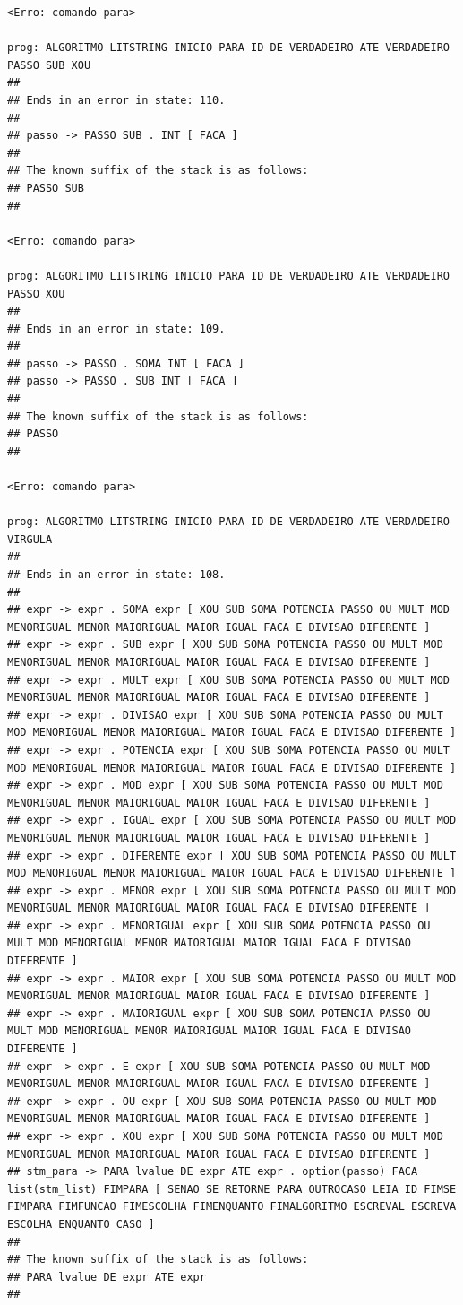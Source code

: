 \documentclass[hidelinks,12pt]{article}
\begin{document}
\begin{lstlisting}
<Erro: comando para>

prog: ALGORITMO LITSTRING INICIO PARA ID DE VERDADEIRO ATE VERDADEIRO PASSO SUB XOU 
##
## Ends in an error in state: 110.
##
## passo -> PASSO SUB . INT [ FACA ]
##
## The known suffix of the stack is as follows:
## PASSO SUB 
##

<Erro: comando para>

prog: ALGORITMO LITSTRING INICIO PARA ID DE VERDADEIRO ATE VERDADEIRO PASSO XOU 
##
## Ends in an error in state: 109.
##
## passo -> PASSO . SOMA INT [ FACA ]
## passo -> PASSO . SUB INT [ FACA ]
##
## The known suffix of the stack is as follows:
## PASSO 
##

<Erro: comando para>

prog: ALGORITMO LITSTRING INICIO PARA ID DE VERDADEIRO ATE VERDADEIRO VIRGULA 
##
## Ends in an error in state: 108.
##
## expr -> expr . SOMA expr [ XOU SUB SOMA POTENCIA PASSO OU MULT MOD MENORIGUAL MENOR MAIORIGUAL MAIOR IGUAL FACA E DIVISAO DIFERENTE ]
## expr -> expr . SUB expr [ XOU SUB SOMA POTENCIA PASSO OU MULT MOD MENORIGUAL MENOR MAIORIGUAL MAIOR IGUAL FACA E DIVISAO DIFERENTE ]
## expr -> expr . MULT expr [ XOU SUB SOMA POTENCIA PASSO OU MULT MOD MENORIGUAL MENOR MAIORIGUAL MAIOR IGUAL FACA E DIVISAO DIFERENTE ]
## expr -> expr . DIVISAO expr [ XOU SUB SOMA POTENCIA PASSO OU MULT MOD MENORIGUAL MENOR MAIORIGUAL MAIOR IGUAL FACA E DIVISAO DIFERENTE ]
## expr -> expr . POTENCIA expr [ XOU SUB SOMA POTENCIA PASSO OU MULT MOD MENORIGUAL MENOR MAIORIGUAL MAIOR IGUAL FACA E DIVISAO DIFERENTE ]
## expr -> expr . MOD expr [ XOU SUB SOMA POTENCIA PASSO OU MULT MOD MENORIGUAL MENOR MAIORIGUAL MAIOR IGUAL FACA E DIVISAO DIFERENTE ]
## expr -> expr . IGUAL expr [ XOU SUB SOMA POTENCIA PASSO OU MULT MOD MENORIGUAL MENOR MAIORIGUAL MAIOR IGUAL FACA E DIVISAO DIFERENTE ]
## expr -> expr . DIFERENTE expr [ XOU SUB SOMA POTENCIA PASSO OU MULT MOD MENORIGUAL MENOR MAIORIGUAL MAIOR IGUAL FACA E DIVISAO DIFERENTE ]
## expr -> expr . MENOR expr [ XOU SUB SOMA POTENCIA PASSO OU MULT MOD MENORIGUAL MENOR MAIORIGUAL MAIOR IGUAL FACA E DIVISAO DIFERENTE ]
## expr -> expr . MENORIGUAL expr [ XOU SUB SOMA POTENCIA PASSO OU MULT MOD MENORIGUAL MENOR MAIORIGUAL MAIOR IGUAL FACA E DIVISAO DIFERENTE ]
## expr -> expr . MAIOR expr [ XOU SUB SOMA POTENCIA PASSO OU MULT MOD MENORIGUAL MENOR MAIORIGUAL MAIOR IGUAL FACA E DIVISAO DIFERENTE ]
## expr -> expr . MAIORIGUAL expr [ XOU SUB SOMA POTENCIA PASSO OU MULT MOD MENORIGUAL MENOR MAIORIGUAL MAIOR IGUAL FACA E DIVISAO DIFERENTE ]
## expr -> expr . E expr [ XOU SUB SOMA POTENCIA PASSO OU MULT MOD MENORIGUAL MENOR MAIORIGUAL MAIOR IGUAL FACA E DIVISAO DIFERENTE ]
## expr -> expr . OU expr [ XOU SUB SOMA POTENCIA PASSO OU MULT MOD MENORIGUAL MENOR MAIORIGUAL MAIOR IGUAL FACA E DIVISAO DIFERENTE ]
## expr -> expr . XOU expr [ XOU SUB SOMA POTENCIA PASSO OU MULT MOD MENORIGUAL MENOR MAIORIGUAL MAIOR IGUAL FACA E DIVISAO DIFERENTE ]
## stm_para -> PARA lvalue DE expr ATE expr . option(passo) FACA list(stm_list) FIMPARA [ SENAO SE RETORNE PARA OUTROCASO LEIA ID FIMSE FIMPARA FIMFUNCAO FIMESCOLHA FIMENQUANTO FIMALGORITMO ESCREVAL ESCREVA ESCOLHA ENQUANTO CASO ]
##
## The known suffix of the stack is as follows:
## PARA lvalue DE expr ATE expr 
##


\end{lstlisting}
\end{document}
